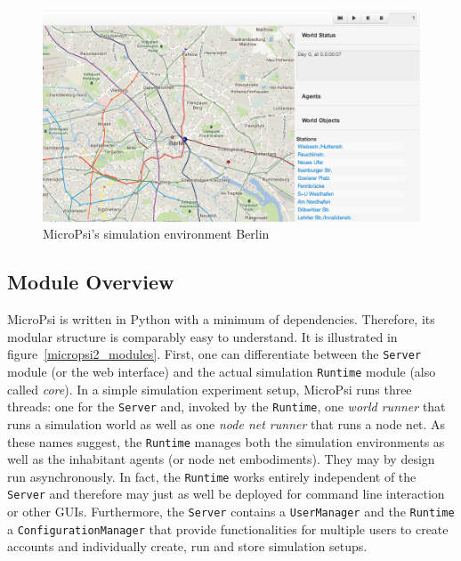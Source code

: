 \begin{figure}[h]
  \centering
    \includegraphics[width=14cm]{graphics/mp2_berlin}
  \caption{MicroPsi's simulation environment Berlin}
  \label{mp2_berlin}
\end{figure}

        \subsection{Module Overview}
                
MicroPsi is written in Python with a minimum of dependencies. Therefore, its  modular structure is comparably easy to understand. It is illustrated in figure~\ref{micropsi2_modules}. First, one can differentiate between the \texttt{Server} module (or the web interface) and the actual simulation \texttt{Runtime} module (also called \emph{core}). In a simple simulation experiment setup, MicroPsi runs three threads: one for the \texttt{Server} and, invoked by the \texttt{Runtime}, one \emph{world runner} that runs a simulation world as well as one \emph{node net runner} that runs a node net. As these names suggest, the \texttt{Runtime} manages both the simulation environments as well as the inhabitant agents (or node net embodiments). They may by design run asynchronously. In fact, the \texttt{Runtime} works entirely independent of the \texttt{Server} and therefore may just as well be deployed for command line interaction or other GUIs. Furthermore, the \texttt{Server} contains a \texttt{UserManager} and the \texttt{Runtime} a \texttt{ConfigurationManager} that provide functionalities for multiple users to create accounts and individually create, run and store simulation setups.~\cite{conf/agi/Bach12}
          
